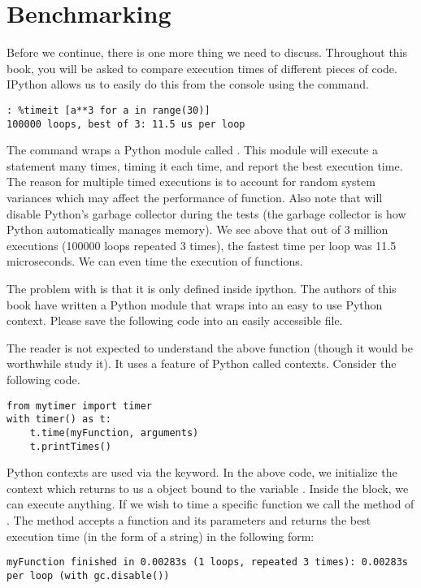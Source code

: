 \section*{Benchmarking}
Before we continue, there is one more thing we need to discuss.  Throughout this book, you will be asked to compare execution times of different pieces of code.  IPython allows us to easily do this from the console using the  command.
\begin{lstlisting}
: %timeit [a**3 for a in range(30)]
100000 loops, best of 3: 11.5 us per loop
\end{lstlisting}
The  command wraps a Python module called .  This module will execute a statement many times, timing it each time, and report the best execution time.  The reason for multiple timed executions is to account for random system variances which may affect the performance of function.  Also note that  will disable Python's garbage collector during the tests (the garbage collector is how Python automatically manages memory).  We see above that out of 3 million executions (100000 loops repeated 3 times), the fastest time per loop was 11.5 microseconds.  We can even time the execution of functions.

The problem with  is that it is only defined inside ipython.  The authors of this book have written a Python module that wraps  into an easy to use Python context.  Please save the following code into an easily accessible file.



The reader is not expected to understand the above function (though it would be worthwhile study it).  It uses a feature of Python called contexts.  Consider the following code.
\begin{lstlisting}
from mytimer import timer
with timer() as t:
    t.time(myFunction, arguments)
    t.printTimes()
\end{lstlisting}

Python contexts are used via the  keyword.  In the above code, we initialize the  context which returns to us a  object bound to the variable .  Inside the block, we can execute anything.  If we wish to time a specific function we call the  method of .  The  method accepts a function and its parameters and returns the best execution time (in the form of a string) in the following form:
\begin{lstlisting}
myFunction finished in 0.00283s (1 loops, repeated 3 times): 0.00283s per loop (with gc.disable())
\end{lstlisting}

